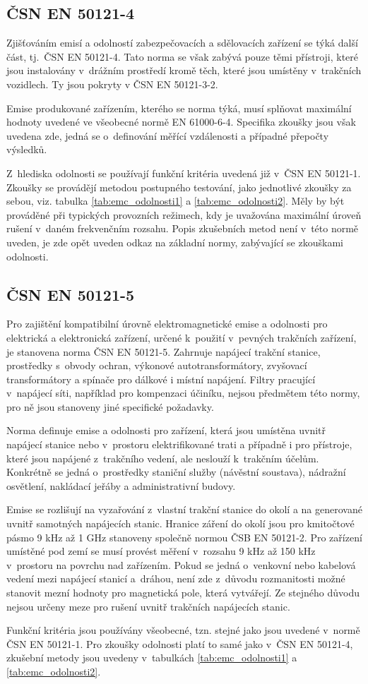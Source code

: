 \subsection{ČSN EN 50121-4}
Zjišťováním emisí a odolností zabezpečovacích a sdělovacích zařízení se týká další část, tj.~ČSN EN 50121-4. Tato norma se však zabývá pouze těmi přístroji, které jsou instalovány v~drážním prostředí kromě těch, které jsou umístěny v~trakčních vozidlech. Ty jsou pokryty v ČSN EN 50121-3-2. 

Emise produkované zařízením, kterého se norma týká, musí splňovat maximální hodnoty uvedené ve všeobecné normě EN 61000-6-4. Specifika zkoušky jsou však uvedena zde, jedná se o~definování měřící vzdálenosti a případné přepočty výsledků.

Z~hlediska odolnosti se používají funkční kritéria uvedená již v~ČSN EN 50121-1. Zkoušky se provádějí metodou postupného testování, jako jednotlivé zkoušky za sebou, viz. tabulka \ref{tab:emc_odolnosti1} a \ref{tab:emc_odolnosti2}.
 Měly by být prováděné při typických provozních režimech, kdy je uvažována maximální úroveň rušení v~daném frekvenčním rozsahu. Popis zkušebních metod není v~této normě uveden, je zde opět uveden odkaz na základní normy, zabývající se zkouškami odolnosti. 

\subsection{ČSN EN 50121-5}
Pro zajištění kompatibilní úrovně elektromagnetické emise a odolnosti pro elektrická a elektronická zařízení, určené k~použití v~pevných trakčních zařízení, je stanovena norma ČSN EN 50121-5. Zahrnuje  napájecí trakční stanice, prostředky s~obvody ochran, výkonové autotransformátory, zvyšovací transformátory a spínače pro dálkové i místní napájení. Filtry pracující v~napájecí síti, například pro kompenzaci účiníku, nejsou předmětem této normy,  pro ně jsou stanoveny jiné specifické požadavky. 

Norma definuje emise a odolnosti pro zařízení, která jsou umístěna uvnitř napájecí stanice nebo v~prostoru elektrifikované trati a případně i pro přístroje, které jsou napájené z~trakčního vedení, ale neslouží k~trakčním účelům. Konkrétně se jedná o~prostředky staniční služby (návěstní soustava), nádražní osvětlení, nakládací jeřáby a administrativní budovy.  

Emise se rozlišují na vyzařování z~vlastní trakční stanice do okolí a na generované uvnitř samotných napájecích stanic. Hranice záření do okolí jsou pro kmitočtové pásmo 9 kHz až 1 GHz stanoveny společně normou ČSB EN 50121-2. Pro zařízení umístěné pod zemí se musí provést měření v~rozsahu 9 kHz až 150 kHz v~prostoru na povrchu nad zařízením. Pokud se jedná o~venkovní nebo kabelová vedení mezi napájecí stanicí a~dráhou, není zde z~důvodu rozmanitosti možné stanovit mezní hodnoty pro magnetická pole, která vytvářejí. Ze stejného důvodu nejsou určeny meze pro rušení uvnitř trakčních napájecích stanic. 

Funkční kritéria jsou používány všeobecné, tzn. stejné jako jsou uvedené v~normě ČSN EN 50121-1. Pro zkoušky odolnosti platí to samé jako v~ČSN EN 50121-4, zkušební metody jsou uvedeny v~tabulkách \ref{tab:emc_odolnosti1} a \ref{tab:emc_odolnosti2}.
